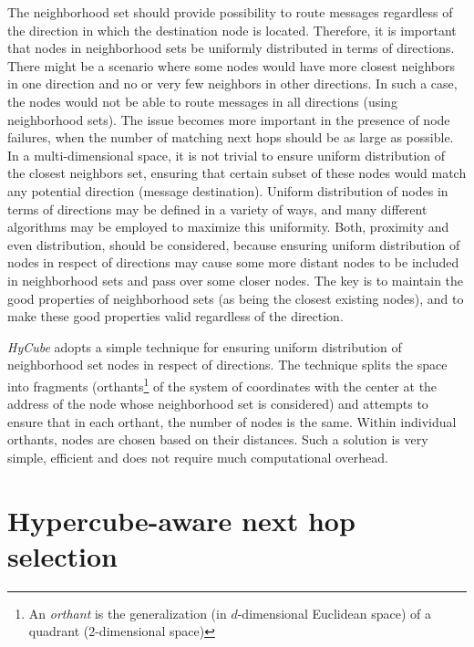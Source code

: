 The neighborhood set should provide possibility to route messages regardless of the direction in which the destination node is located. Therefore, it is important that nodes in neighborhood sets be uniformly distributed in terms of directions. There might be a scenario where some nodes would have more closest neighbors in one direction and no or very few neighbors in other directions. In such a case, the nodes would not be able to route messages in all directions (using neighborhood sets). The issue becomes more important in the presence of node failures, when the number of matching next hops should be as large as possible. In a multi-dimensional space, it is not trivial to ensure uniform distribution of the closest neighbors set, ensuring that certain subset of these nodes would match any potential direction (message destination). Uniform distribution of nodes in terms of directions may be defined in a variety of ways, and many different algorithms may be employed to maximize this uniformity. Both, proximity and even distribution, should be considered, because ensuring uniform distribution of nodes in respect of directions may cause some more distant nodes to be included in neighborhood sets and pass over some closer nodes. The key is to maintain the good properties of neighborhood sets (as being the closest existing nodes), and to make these good properties valid regardless of the direction.

\emph{HyCube} adopts a simple technique for ensuring uniform distribution of neighborhood set nodes in respect of directions. The technique splits the space into fragments (orthants\footnote{An \emph{orthant} is the generalization (in $d$-dimensional Euclidean space) of a quadrant (2-dimensional space)} of the system of coordinates with the center at the address of the node whose neighborhood set is considered) and attempts to ensure that in each orthant, the number of nodes is the same. Within individual orthants, nodes are chosen based on their distances. Such a solution is very simple, efficient and does not require much computational overhead. 





\section{Hypercube-aware next hop selection}

